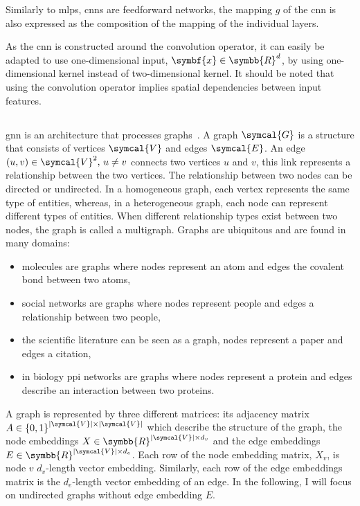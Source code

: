 \documentclass[../main.tex]{subfiles}
\begin{document}
		Similarly to \glspl{mlp}, \glspl{cnn} are feedforward networks, the mapping \(g\) of the \gls{cnn} is also expressed as the composition of the mapping of the individual layers.

		As the \gls{cnn} is constructed around the convolution operator, it can easily be adapted to use one-dimensional input, \(\symbf{x} \in \symbb{R}^d\), by using one-dimensional kernel instead of two-dimensional kernel.
		It should be noted that using the convolution operator implies spatial dependencies between input features.

	\subsection{}
		\Gls{gnn} is an architecture that processes graphs~\cite{GNNRefs}.
		A graph \(\symcal{G}\) is a structure that consists of vertices \(\symcal{V}\) and edges \(\symcal{E}\).
		An edge \(\left(u,v\right) \in \symcal{V}^2,\, u\neq v\) connects two vertices \(u\) and \(v\), this link represents a relationship between the two vertices.
		The relationship between two nodes can be directed or undirected.
		In a homogeneous graph, each vertex represents the same type of entities, whereas, in a heterogeneous graph, each node can represent different types of entities.
		When different relationship types exist between two nodes, the graph is called a multigraph.
		Graphs are ubiquitous and are found in many domains:
		\begin{itemize}[nosep]
			\item molecules are graphs where nodes represent an atom and edges the covalent bond between two atoms,
			\item social networks are graphs where nodes represent people and edges a relationship between two people,
			\item the scientific literature can be seen as a graph, nodes represent a paper and edges a citation,
			\item in biology \gls{ppi} networks are graphs where nodes represent a protein and edges describe an interaction between two proteins.
		\end{itemize}

		A graph is represented by three different matrices: its adjacency matrix \(A \in {\left\{0,1\right\}}^{\left|\symcal{V}\right| \times \left|\symcal{V}\right|}\) which describe the structure of the graph, the node embeddings \(X \in \symbb{R}^{\left|\symcal{V}\right| \times d_v}\) and the edge embeddings \(E \in \symbb{R}^{\left|\symcal{V}\right| \times d_e}\).
		Each row of the node embedding matrix, \(X_{v}\), is node \(v\) \(d_v\)-length vector embedding.
		Similarly, each row of the edge embeddings matrix is the \(d_e\)-length vector embedding of an edge.
		In the following, I will focus on undirected graphs without edge embedding \(E\).
\end{document}
